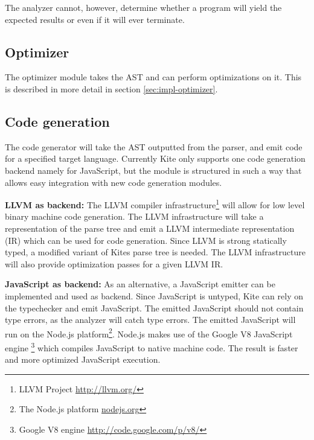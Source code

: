 The analyzer cannot, however, determine whether a program will yield the expected results or even if it will ever terminate.


\subsection{Optimizer}
The optimizer module takes the AST and can perform optimizations on it. This is described in more detail in section \ref{sec:impl-optimizer}.


\subsection{Code generation}
The code generator will take the AST outputted from the parser, and emit code for a specified target language. Currently Kite only supports one code generation backend namely for JavaScript, but the module is structured in such a way that allows easy integration with new code generation modules.

\textbf{LLVM as backend:} The LLVM compiler
infrastructure\footnote{LLVM Project \url{http://llvm.org/}} will allow
for low level binary machine code generation. The LLVM infrastructure
will take a representation of the parse tree and emit a LLVM
intermediate representation (IR) which can be used for code
generation. Since LLVM is strong statically typed, a modified variant
of Kites parse tree is needed. The LLVM infrastructure will also provide
optimization passes for a given LLVM IR.

\textbf{JavaScript as backend:} As an alternative, a JavaScript emitter
can be implemented and used as backend. Since JavaScript is untyped,
Kite can rely on the typechecker and emit JavaScript. The emitted
JavaScript should not contain type errors, as the analyzer will
catch type errors. The emitted JavaScript will run on the
Node.js platform\footnote{ The Node.js platform \url{nodejs.org}}.
Node.js makes use of the Google V8 JavaScript engine \footnote{Google
  V8 engine \url{http://code.google.com/p/v8/}} which compiles JavaScript to
native machine code. The result is faster and more optimized
JavaScript execution.

